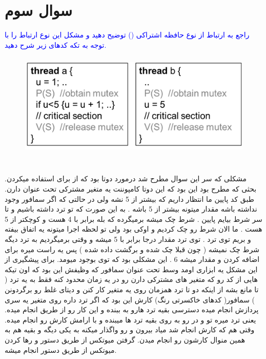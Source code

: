 \documentclass[12pt,a4paper]{article}							   %
\begin{document}
\section{سوال سوم }
	\begin{RTL}
			\textcolor{blue}{
راجع به ارتباط از نوع حافظه اشتراکی
()
توضیح دهید و مشکل این نوع ارتباط را با توجه به تکه کدهای زیر شرح دهید.   \\
			}
			\begin{figure}[h!]
			\centering
			\includegraphics*[height=5cm]{img2}
			\end{figure}
\\
مشکلی که سر این سوال مطرح شد درمورد دوتا 
 بود که از
  برای
  استفاده میکردن. بحثی که مطرح بود این بود که این دوتا کامپوننت یه متغیر مشترکی تحت عنوان
  دارن. طبق کد پایین ما انتظار داریم که
 بیشتر از 5 نشه ولی در حالتی که  اگر سمافور وجود نداشته باشه مقدار
  میتونه بیشتر از 5 باشه . به این صورت که تو ترد
 داشته باشیم
و تا سر شرط
بیایم پایین . شرط چک میشه
  برمیگرده که  بله
 برابر با 4 هست و کوچکتر از 5 هست . ما الان شرط رو چک کردیم و اوکی بود ولی تو لحظه اجرا میتونه یه 
 اتفاق بیفته و بریم توی ترد
. توی ترد 
  مقدار
  درجا برابر با 5 میشه و وقتی برمیگردیم به ترد
 دیگه شرط چک نمیشه ( چون قبلا چک شده و 
  برگشت داده شده ) پس یه راست میره برای اضافه کردن و مقدار 
میشه 6 . این مشکلی بود که توی 
 بوجود میومد. برای پیشگیری از این مشکل یه ابزاری اومد وسط تحت عنوان سمافور که وظیفش این بود که اون تیکه هایی از کد رو که متغیر های مشترکی دارن رو در یه زمان محدود کنه فقط به یه ترد ( تا مانع بشه از اینکه دو تا ترد همزمان روی یه متغیر کار کنن و دیتای غلط رو برگردونن ) سمافور( کدهای خاکسرتی رنگ) کارش این بود که اگر ترد  
 داره روی متغیر
   یه سری پردازش انجام میده دسترسی بقیه ترد هارو به
  ببنده و این کار رو از طریق
   انجام میده. یعنی ترد
  میره تو 
  و در رو به روی بقیه ترد ها میبنده و با ارامش کارش رو انجام میده. وقتی هم که کارش انجام شد میاد بیرون و
    رو واگذار میکنه به یکی دیگه و بقیه هم به همین منوال کارشون رو انجام میدن. گرفتن میوتکس از طریق دستور 
  و رها کردن میوتکس از طریق دستور
  انجام میشه.

	\end{RTL}
\newpage

\end{document}
